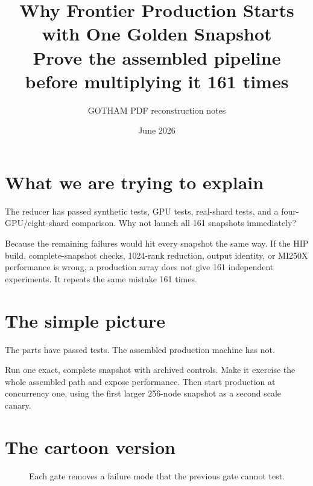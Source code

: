 \documentclass[11pt]{article}
\title{Why Frontier Production Starts with One Golden Snapshot\\\large Prove the assembled pipeline before multiplying it 161 times}
\author{GOTHAM PDF reconstruction notes}
\date{June 2026}
\begin{document}
\maketitle
{}

\section{What we are trying to explain}

The reducer has passed synthetic tests, GPU tests, real-shard tests, and a
four-GPU/eight-shard comparison. Why not launch all 161 snapshots immediately?

Because the remaining failures would hit every snapshot the same way. If the
HIP build, complete-snapshot checks, 1024-rank reduction, output identity, or
MI250X performance is wrong, a production array does not give 161 independent
experiments. It repeats the same mistake 161 times.

\section{The simple picture}

The parts have passed tests. The assembled production machine has not.

Run one exact, complete snapshot with archived controls. Make it exercise the
whole assembled path and expose performance. Then start production at concurrency one,
using the first larger 256-node snapshot as a second scale canary.

\section{The cartoon version}

\begin{figure}[ht]
\centering
{}
\caption{Each gate removes a failure mode that the previous gate cannot test.
\schematicnote}
\end{figure}
\end{document}
